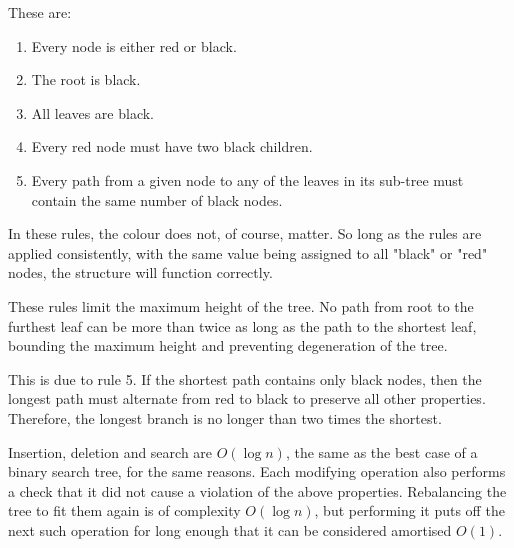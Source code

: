\documentclass[]{article}
\begin{document}
These are:

\begin{enumerate}
	\item Every node is either red or black.
	\item The root is black.
	\item All leaves are black. 
	\item Every red node must have two black children.
	\item Every path from a given node to any of the leaves in its sub-tree must contain the same number of black nodes.
\end{enumerate}

In these rules, the colour does not, of course, matter. So long as the rules are applied consistently, with the same value being assigned to all "black" or "red" nodes, the structure will function correctly.

These rules limit the maximum height of the tree. No path from root to the furthest leaf can be more than twice as long as the path to the shortest leaf, bounding the maximum height and preventing degeneration of the tree.

This is due to rule 5. If the shortest path contains only black nodes, then the longest path must alternate from red to black to preserve all other properties. Therefore, the longest branch is no longer than two times the shortest.

Insertion, deletion and search are $O(\log{n})$, the same as the best case of a binary search tree, for the same reasons. Each modifying operation also performs a check that it did not cause a violation of the above properties. Rebalancing the tree to fit them again is of complexity $O(\log{n})$, but performing it puts off the next such operation for long enough that it can be considered amortised $O(1)$.
\end{document}
